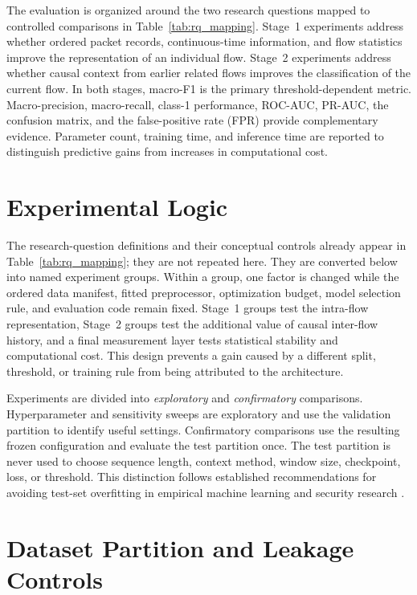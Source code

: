 The evaluation is organized around the two research questions mapped to
controlled comparisons in Table~\ref{tab:rq_mapping}. Stage~1 experiments
address whether ordered packet records,
continuous-time information, and flow statistics improve the representation
of an individual flow. Stage~2 experiments address whether causal context from
earlier related flows improves the classification of the current flow. In both
stages, macro-F1 is the primary threshold-dependent metric. Macro-precision,
macro-recall, class-1 performance, ROC-AUC, PR-AUC, the confusion matrix, and
the false-positive rate (FPR) provide complementary evidence. Parameter count,
training time, and inference time are reported to distinguish predictive gains
from increases in computational cost.

\section{Experimental Logic}
\label{subsec:experimental_questions}

The research-question definitions and their conceptual controls already appear
in Table~\ref{tab:rq_mapping}; they are not repeated here. They are converted
below into named experiment groups. Within a group, one factor is changed while
the ordered data manifest, fitted preprocessor, optimization budget, model
selection rule, and evaluation code remain fixed. Stage~1 groups test the
intra-flow representation, Stage~2 groups test the additional value of causal
inter-flow history, and a final measurement layer tests statistical stability
and computational cost. This design prevents a gain caused by a different
split, threshold, or training rule from being attributed to the architecture.

Experiments are divided into \emph{exploratory} and \emph{confirmatory}
comparisons. Hyperparameter and sensitivity sweeps are exploratory and use the
validation partition to identify useful settings. Confirmatory comparisons use
the resulting frozen configuration and evaluate the test partition once. The
test partition is never used to choose sequence length, context method, window
size, checkpoint, loss, or threshold. This distinction follows established
recommendations for avoiding test-set overfitting in empirical machine
learning and security research \cite{Arp2022DosDonts,Pineau2021Reproducibility}.

\section{Dataset Partition and Leakage Controls}
\label{subsec:experimental_data_protocol}

